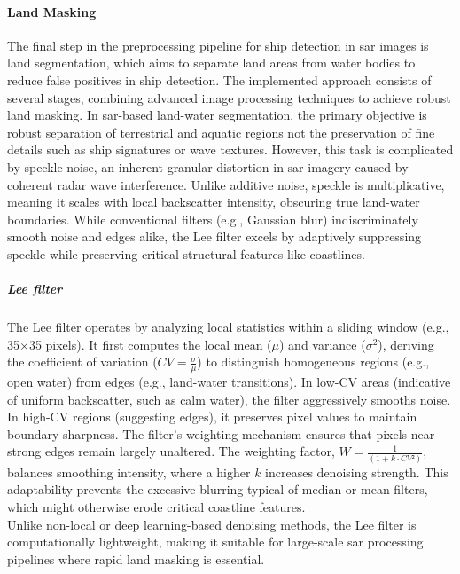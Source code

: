 \documentclass{article}
\begin{document}
\paragraph{Land Masking}
The final step in the preprocessing pipeline for ship detection in \acrshort{sar} images is land segmentation, which aims to separate land areas from water bodies to reduce false positives in ship detection. The implemented approach consists of several stages, combining advanced image processing techniques to achieve robust land masking. In \acrshort{sar}-based land-water segmentation, the primary objective is robust separation of terrestrial and aquatic regions not the preservation of fine details such as ship signatures or wave textures. However, this task is complicated by speckle noise, an inherent granular distortion in \acrshort{sar} imagery caused by coherent radar wave interference. Unlike additive noise, speckle is multiplicative, meaning it scales with local backscatter intensity, obscuring true land-water boundaries. While conventional filters (e.g., Gaussian blur) indiscriminately smooth noise and edges alike, the Lee filter excels by adaptively suppressing speckle while preserving critical structural features like coastlines. \subparagraph{Lee filter}
The Lee filter operates by analyzing local statistics within a sliding window (e.g., 35×35 pixels). It first computes the local mean ($\mu$) and variance ($\sigma^2$), deriving the coefficient of variation ($CV = \frac{\sigma}{\mu}$) to distinguish homogeneous regions (e.g., open water) from edges (e.g., land-water transitions). In low-CV areas (indicative of uniform backscatter, such as calm water), the filter aggressively smooths noise. In high-CV regions (suggesting edges), it preserves pixel values to maintain boundary sharpness. The filter’s weighting mechanism ensures that pixels near strong edges remain largely unaltered. The weighting factor, $W =\frac{1}{(1 + k·CV²)}$, balances smoothing intensity, where a higher $k$ increases denoising strength. This adaptability prevents the excessive blurring typical of median or mean filters, which might otherwise erode critical coastline features.\\

Unlike non-local or deep learning-based denoising methods, the Lee filter is computationally lightweight, making it suitable for large-scale \acrshort{sar} processing pipelines where rapid land masking is essential.\\
\end{document}
